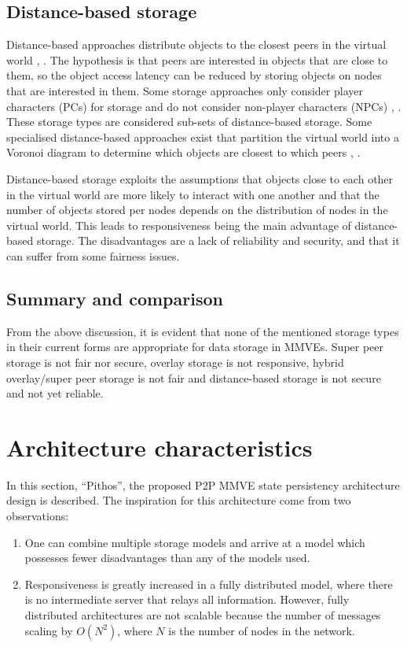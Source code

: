 \documentclass[10pt,a4paper,conference]{IEEEtran}
\begin{document}
\subsection{Distance-based storage}
\label{classic_distance_based}

Distance-based approaches distribute objects to the closest peers in the virtual world \cite{colyseus_distance_based}, \cite{solipsis}. The
hypothesis is that peers are interested in objects that are close to them, so the object access latency can be reduced by storing objects on nodes
that are interested in them. Some storage approaches only consider player characters (PCs) for storage and do not consider non-player characters
(NPCs) \cite{individual_storage1}, \cite{cheat_proof_playout}. These storage types are considered sub-sets of distance-based storage. Some
specialised distance-based approaches exist that partition the virtual world into a Voronoi diagram to determine which objects are closest to which
peers \cite{Buyukkaya_voronoi_state_management}, \cite{Hu_voronoi_IM}.

Distance-based storage exploits the assumptions that objects close to each other in the virtual world are more likely to interact with one another
and that the number of objects stored per nodes depends on the distribution of nodes in the virtual world. This leads to responsiveness being the
main advantage of distance-based storage. The disadvantages are a lack of reliability and security, and that it can suffer from some fairness issues.

\subsection{Summary and comparison}

From the above discussion, it is evident that none of the mentioned storage types in their current forms are appropriate for data storage in MMVEs.
Super peer storage is not fair nor secure, overlay storage is not responsive, hybrid overlay/super peer storage is not fair and distance-based
storage is not secure and not yet reliable.

\section{Architecture characteristics}
\label{design}

In this section, ``Pithos'', the proposed P2P MMVE state persistency architecture design is described. The inspiration for this architecture come
from two observations:
%
\begin{enumerate}
  \item One can combine multiple storage models and arrive at a model which possesses fewer disadvantages than any of the models used.
  \item Responsiveness is greatly increased in a fully distributed model, where there is no intermediate server that relays all information.
      However, fully distributed architectures are not scalable because the number of messages scaling by $O(N^2)$, where $N$ is the number of
      nodes in the network.
\end{enumerate}
\end{document}
